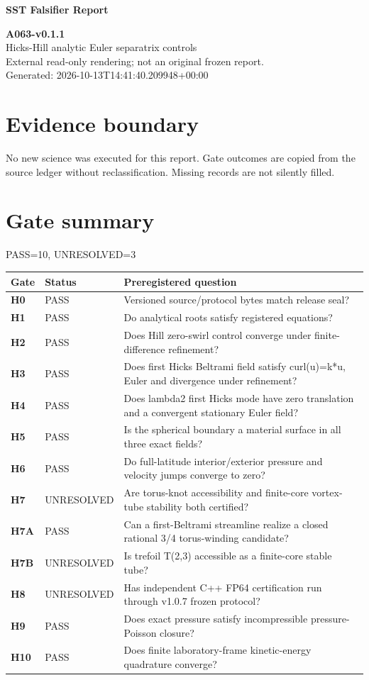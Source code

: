 \documentclass[10pt,a4paper]{article}
\begin{document}
\color{navy}\Huge\bfseries SST Falsifier Report\par\normalsize\mdseries\color{black}
\textbf{A063-v0.1.1}\\
Hicks-Hill analytic Euler separatrix controls\\
External read-only rendering; not an original frozen report.\\
Generated: 2026-10-13T14:41:40.209948+00:00\\
\section*{Evidence boundary}
No new science was executed for this report. Gate outcomes are copied from the source ledger without reclassification. Missing records are not silently filled.
\section*{Gate summary}
PASS=10, UNRESOLVED=3
\begin{longtable}{p{13mm}p{24mm}p{119mm}}
\toprule Gate & Status & Preregistered question \\
\midrule\endhead
\textbf{H0} & PASS & Versioned source/protocol bytes match release seal?\\\hline
\textbf{H1} & PASS & Do analytical roots satisfy registered equations?\\\hline
\textbf{H2} & PASS & Does Hill zero-swirl control converge under finite-difference refinement?\\\hline
\textbf{H3} & PASS & Does first Hicks Beltrami field satisfy curl(u)=k*u, Euler and divergence under refinement?\\\hline
\textbf{H4} & PASS & Does lambda2 first Hicks mode have zero translation and a convergent stationary Euler field?\\\hline
\textbf{H5} & PASS & Is the spherical boundary a material surface in all three exact fields?\\\hline
\textbf{H6} & PASS & Do full-latitude interior/exterior pressure and velocity jumps converge to zero?\\\hline
\textbf{H7} & UNRESOLVED & Are torus-knot accessibility and finite-core vortex-tube stability both certified?\\\hline
\textbf{H7A} & PASS & Can a first-Beltrami streamline realize a closed rational 3/4 torus-winding candidate?\\\hline
\textbf{H7B} & UNRESOLVED & Is trefoil T(2,3) accessible as a finite-core stable tube?\\\hline
\textbf{H8} & UNRESOLVED & Has independent C++ FP64 certification run through v1.0.7 frozen protocol?\\\hline
\textbf{H9} & PASS & Does exact pressure satisfy incompressible pressure-Poisson closure?\\\hline
\textbf{H10} & PASS & Does finite laboratory-frame kinetic-energy quadrature converge?\\\hline
\bottomrule\end{longtable}
\end{document}
